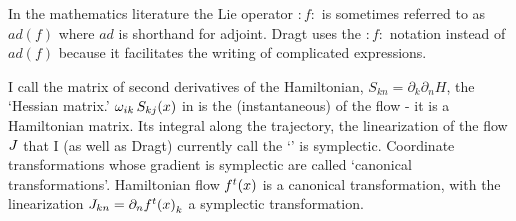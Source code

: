{In the mathematics literature the Lie operator $:f:$ is sometimes
referred to as $ad(f)$ where $ad$ is shorthand for adjoint. Dragt uses the
$:f:$ notation instead of $ad(f)$ because it facilitates the writing of
complicated expressions.

I call the matrix of second derivatives of the Hamiltonian, $S_{kn}=
\partial_k \partial_n H$, the `Hessian matrix.'
${\omega}_{ik}\,S_{kj}(x)$ in  is the (instantaneous)
{\stabmat} of the flow - it is a Hamiltonian matrix. Its integral along
the trajectory, the linearization of the flow ${J}$ that I (as well
as Dragt) currently call the `\JacobianM' is symplectic.
Coordinate transformations whose gradient is symplectic are called
`canonical transformations'. Hamiltonian flow ${f^{t}(x)}$ is a
canonical transformation, with the linearization $J_{kn} = \partial_n
{f^{t}(x)}_k$  a symplectic transformation.

        } %


